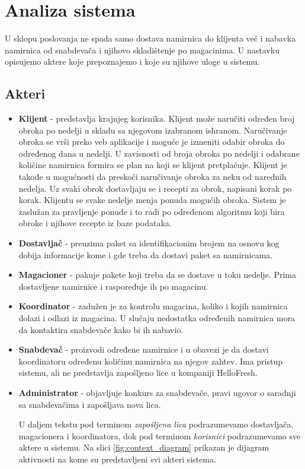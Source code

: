 
\section{Analiza sistema}

	U sklopu poslovanja ne spada samo dostava namirnica do klijenta već i nabavka namirnica od snabdevača i njihovo skladištenje po magacinima. U nastavku opisujemo aktere koje prepoznajemo i koje su njihove uloge u sistemu.

\subsection{Akteri}
	\begin{itemize}
		\item{\textbf{Klijent}} - predstavlja krajnjeg korisnika. Klijent može naručiti određen broj obroka po nedelji u skladu sa njegovom izabranom ishranom. Naručivanje obroka se vrši preko veb aplikacije i moguće je izmeniti odabir obroka do određenog dana u nedelji. U zavisnosti od broja obroka po nedelji i odabrane količine namirnica formira se plan na koji se klijent pretplaćuje. Klijent je takođe u mogućnosti da preskoči naručivanje obroka za neku od narednih nedelja. Uz svaki obrok dostavljaju se i recepti za obrok, napisani korak po korak. Klijentu se svake nedelje menja ponuda mogućih obroka. Sistem je zaslužan za pravljenje ponude i to radi po određenom algoritmu koji bira obroke i njihove recepte iz baze podataka.
		\item{\textbf{Dostavljač}} - preuzima paket sa identifikacionim brojem na osnovu kog dobija informacije kome i gde treba da dostavi paket sa namirnicama.
		\item{\textbf{Magacioner}} - pakuje pakete koji treba da se dostave u toku nedelje. Prima dostavljene namirnice i raspoređuje ih po magacinu.
		\item{\textbf{Koordinator}} - zadužen je za kontrolu magacina, koliko i kojih namirnica dolazi i odlazi iz magacina. U slučaju nedostatka određenih namirnica mora da kontaktira snabdevače kako bi ih nabavio.
		\item{\textbf{Snabdevač}} - proizvodi određene namirnice i u obavezi je da dostavi koordinatoru određenu količinu namirnica na njegov zahtev. Ima pristup sistemu, ali ne predstavlja zapošljeno lice u kompaniji HelloFresh.
		\item{\textbf{Administrator}} - objavljuje konkurs za snabdevače, pravi ugovor o saradnji sa snabdevačima i zapošljava nova lica. 
		
		U daljem tekstu pod terminom \textit{zapošljena lica} podrazumevamo dostavljača, magacionera i koordinatora, dok pod terminom \textit{korisnici} podrazumevamo sve aktere u sistemu. Na slici \ref{fig:context_diagram} prikazan je dijagram aktivnosti na kome su predstavljeni svi akteri sistema.
		
				
	\end{itemize}
